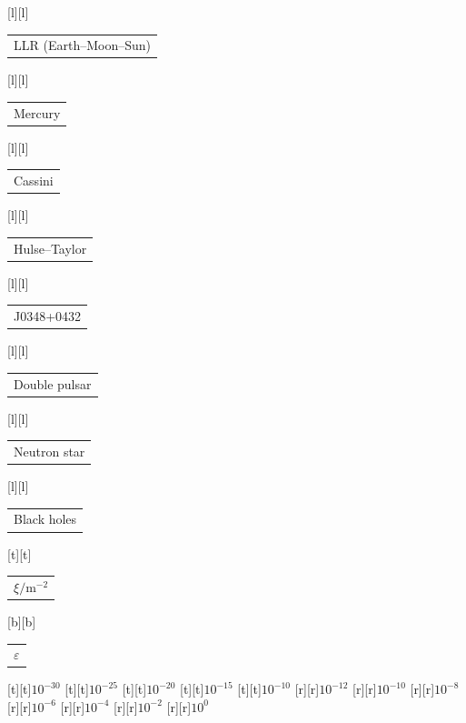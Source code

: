\begin{psfrags}
[l][l]{\color[rgb]{0,0,0}\setlength{\tabcolsep}{0pt}\begin{tabular}{l}LLR (Earth--Moon--Sun)\end{tabular}}%
[l][l]{\color[rgb]{0,0,0}\setlength{\tabcolsep}{0pt}\begin{tabular}{l}Mercury\end{tabular}}%
[l][l]{\color[rgb]{0,0,0}\setlength{\tabcolsep}{0pt}\begin{tabular}{l}Cassini\end{tabular}}%
[l][l]{\color[rgb]{0,0,0}\setlength{\tabcolsep}{0pt}\begin{tabular}{l}Hulse--Taylor\end{tabular}}%
[l][l]{\color[rgb]{0,0,0}\setlength{\tabcolsep}{0pt}\begin{tabular}{l}J0348+0432\end{tabular}}%
[l][l]{\color[rgb]{0,0,0}\setlength{\tabcolsep}{0pt}\begin{tabular}{l}Double pulsar\end{tabular}}%
[l][l]{\color[rgb]{0,0,0}\setlength{\tabcolsep}{0pt}\begin{tabular}{l}Neutron star\end{tabular}}%
[l][l]{\color[rgb]{0,0,0}\setlength{\tabcolsep}{0pt}\begin{tabular}{l}Black holes\end{tabular}}%
[t][t]{\color[rgb]{0,0,0}\setlength{\tabcolsep}{0pt}\begin{tabular}{c}{\Large{$\xi/\mathrm{m^{-2}}$}}\end{tabular}}%
[b][b]{\color[rgb]{0,0,0}\setlength{\tabcolsep}{0pt}\begin{tabular}{c}{\Large{$\varepsilon$}}\end{tabular}}%
%
[t][t]{$10^{-30}$}%
[t][t]{$10^{-25}$}%
[t][t]{$10^{-20}$}%
[t][t]{$10^{-15}$}%
[t][t]{$10^{-10}$}%
%
[r][r]{$10^{-12}$}%
[r][r]{$10^{-10}$}%
[r][r]{$10^{-8}$}%
[r][r]{$10^{-6}$}%
[r][r]{$10^{-4}$}%
[r][r]{$10^{-2}$}%
[r][r]{$10^{0}$}%
%
%
\end{psfrags}%
%
